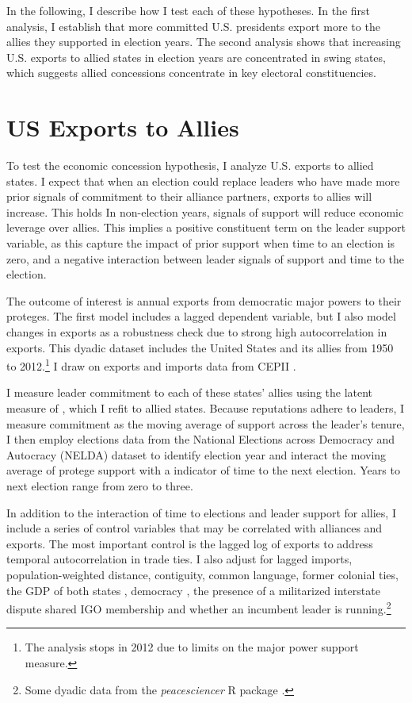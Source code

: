 \documentclass[12pt]{article}
\begin{document}
In the following, I describe how I test each of these hypotheses. 
In the first analysis, I establish that more committed U.S. presidents export more to the allies they supported in election years. 
The second analysis shows that increasing U.S. exports to allied states in election years are concentrated in swing states, which suggests allied concessions concentrate in key electoral constituencies.



\section{US Exports to Allies}

To test the economic concession hypothesis, I analyze U.S. exports to allied states. 
I expect that when an election could replace leaders who have made more prior signals of commitment to their alliance partners, exports to allies will increase. 
This holds 
In non-election years, signals of support will reduce economic leverage over allies.
This implies a positive constituent term on the leader support variable, as this capture the impact of prior support when time to an election is zero, and a negative interaction between leader signals of support and time to the election.


The outcome of interest is annual exports from democratic major powers to their proteges. 
The first model includes a lagged dependent variable, but I also model changes in exports as a robustness check due to strong high autocorrelation in exports.
This dyadic dataset includes the United States and its allies from 1950 to 2012.\footnote{The analysis stops in 2012 due to limits on the major power support measure.}
I draw on exports and imports data from CEPII \citep{FouquinHugot2016}.


I measure leader commitment to each of these states' allies using the latent measure of \citet{McManusNieman2019}, which I refit to allied states. 
Because reputations adhere to leaders, I measure commitment as the moving average of support across the leader's tenure, 
I then employ elections data from the National Elections across Democracy and Autocracy (NELDA) dataset \citep{HydeMarinov2012} to identify election year and interact the moving average of protege support with a indicator of time to the next election.
Years to next election range from zero to three. 


In addition to the interaction of time to elections and leader support for allies, I include a series of control variables that may be correlated with alliances and exports. 
The most important control is the lagged log of exports to address temporal autocorrelation in trade ties.
I also adjust for lagged imports, population-weighted distance, contiguity, common language, former colonial ties, the GDP of both states \citep{FouquinHugot2016}, democracy \citep{Marquez2016}, the presence of a militarized interstate dispute \citep{Gibleretal2016} shared IGO membership \citep{Pevehouseetal2020} and whether an incumbent leader is running.\footnote{Some dyadic data from the \textit{peacesciencer} \textsf{R} package \citep{peacesciencer-package}.}
\end{document}

